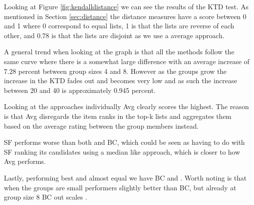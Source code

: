 Looking at Figure \ref{fig:kendalldistance} we can see the results of the KTD test. As mentioned in Section \ref{sec:distance} the distance measures have a score between 0 and 1 where 0 correspond to equal lists, 1 is that the lists are reverse of each other, and 0.78 is that the lists are disjoint as we use a average approach. 

A general trend when looking at the graph is that all the methods follow the same curve where there is a somewhat large difference with an average increase of $7.28$ percent between group sizes 4 and 8. However as the groups grow the increase in the KTD fades out and becomes very low and as such the increase between 20 and 40 is approximately 0.945 percent.

Looking at the approaches individually Avg clearly scores the highest. The reason is that Avg disregards the item ranks in the top-k lists and aggregates them based on the average rating between the group members instead.

SF performs worse than both \MC and BC, which could be seen as having to do with SF ranking its candidates using a median like approach, which is closer to how Avg performs.
   

Lastly, performing best and almost equal we have BC and \MC. Worth noting is that when the groups are small \MC performers slightly better than BC, but already at group size 8 BC out scales \MC.

